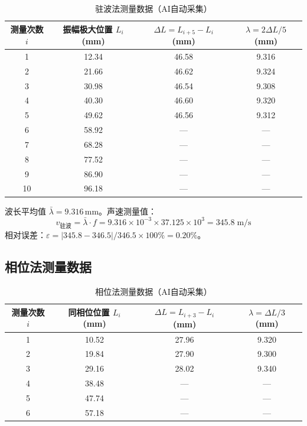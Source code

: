 \begin{table}[h]
    \centering
    \caption{驻波法测量数据（AI自动采集）}
    \begin{tabular}{|c|c|c|c|}
        \hline
        测量次数 $i$ & 振幅极大位置 $L_i$ (mm) & $\Delta L=L_{i+5}-L_i$ (mm) & $\lambda=2\Delta L/5$ (mm) \\
        \hline
        1 & 12.34 & 46.58 & 9.316 \\
        2 & 21.66 & 46.62 & 9.324 \\
        3 & 30.98 & 46.54 & 9.308 \\
        4 & 40.30 & 46.60 & 9.320 \\
        5 & 49.62 & 46.56 & 9.312 \\
        \hline
        6 & 58.92 & --- & --- \\
        7 & 68.28 & --- & --- \\
        8 & 77.52 & --- & --- \\
        9 & 86.90 & --- & --- \\
        10 & 96.18 & --- & --- \\
        \hline
    \end{tabular}
\end{table}

波长平均值 $\bar{\lambda}=9.316$\,mm。声速测量值：
\begin{equation}
    v_{\text{驻波}}=\bar{\lambda}\cdot f=9.316\times 10^{-3}\times 37.125\times 10^3
    =345.8\;\mathrm{m/s}
\end{equation}
相对误差：$\varepsilon=|345.8-346.5|/346.5\times 100\%=0.20\%$。

\subsection{相位法测量数据}

\begin{table}[h]
    \centering
    \caption{相位法测量数据（AI自动采集）}
    \begin{tabular}{|c|c|c|c|}
        \hline
        测量次数 $i$ & 同相位位置 $L_i$ (mm) & $\Delta L=L_{i+3}-L_i$ (mm) & $\lambda=\Delta L/3$ (mm) \\
        \hline
        1 & 10.52 & 27.96 & 9.320 \\
        2 & 19.84 & 27.90 & 9.300 \\
        3 & 29.16 & 28.02 & 9.340 \\
        \hline
        4 & 38.48 & --- & --- \\
        5 & 47.74 & --- & --- \\
        6 & 57.18 & --- & --- \\
        \hline
    \end{tabular}
\end{table}

